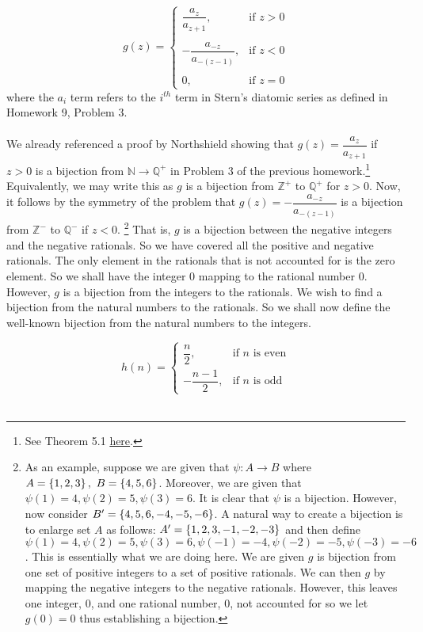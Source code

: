 \documentclass[12pt]{article}
\begin{document}
$$
g(z) =
\begin{cases}
\dfrac{a_{z}}{a_{z+1}}, & \text{if } z>0 \\ \\
- \dfrac{a_{-z}}{a_{-(z-1)}}, & \text{if } z<0 \\ \\
0, & \text{if } z=0
\end{cases}
$$
where the $a_{i}$ term refers to the $i^{th}$ term in Stern's diatomic series as defined in Homework 9, Problem 3. \\ \\

We already referenced a proof by Northshield showing that $g(z)=\dfrac{a_{z}}{a_{z+1}}$ if $z>0$ is a bijection from $\mathbb{N} \rightarrow \mathbb{Q}^{+}$ in Problem 3 of the previous homework.\footnote{See Theorem 5.1 \href{http://faculty.plattsburgh.edu/sam.northshield/08-0412.pdf}{here}.} Equivalently, we may write this as $g$ is a bijection from $\mathbb{Z}^{+}$ to $\mathbb{Q}^{+}$ for $z>0$. Now, it follows by the symmetry of the problem that $g(z)=- \dfrac{a_{-z}}{a_{-(z-1)}}$ is a bijection from $\mathbb{Z}^{-}$ to $\mathbb{Q}^{-}$ if $z<0$. \footnote{As an example, suppose we are given that $\psi:A \rightarrow B$ where $A=\left\{1,2,3\right\},~B=\left\{4,5,6\right\}$. Moreover, we are given that $\psi(1)=4, \psi(2)=5, \psi(3)=6$. It is clear that $\psi$ is a bijection. However, now consider $B'=\left\{4,5,6,-4,-5,-6\right\}$. A natural way to create a bijection is to enlarge set $A$ as follows: $A' = \left\{1,2,3,-1,-2,-3\right\}$ and then define $\psi(1)=4, \psi(2)=5, \psi(3)=6, \psi(-1)=-4, \psi(-2)=-5, \psi(-3)=-6$. This is essentially what we are doing here. We are given $g$ is bijection from one set of positive integers to a set of positive rationals. We can then  $g$ by mapping the negative integers to the negative rationals. However, this leaves one integer, 0, and one rational number, 0, not accounted for so we let $g(0)=0$ thus establishing a bijection.} That is, $g$ is a bijection between the negative integers and the negative rationals. So we have covered all the positive and negative rationals. The only element in the rationals that is not accounted for is the zero element. So we shall have the integer 0 mapping to the rational number 0.  However, $g$ is a bijection from the integers to the rationals. We wish to find a bijection from the natural numbers to the rationals. So we shall now define the well-known bijection from the natural numbers to the integers.

$$
h(n) =
\begin{cases}
\dfrac{n}{2}, & \text{if }n\text{ is even} \\
-\dfrac{n-1}{2}, & \text{if }n\text{ is odd}
\end{cases}
$$ \\
\end{document}

